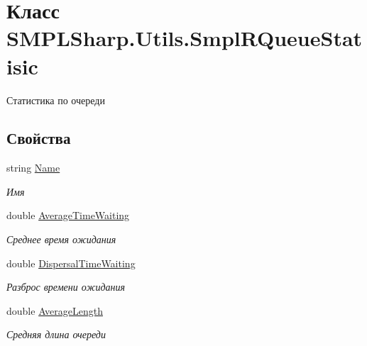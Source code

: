 \hypertarget{class_s_m_p_l_sharp_1_1_utils_1_1_smpl_r_queue_statisic}{\section{Класс S\-M\-P\-L\-Sharp.\-Utils.\-Smpl\-R\-Queue\-Statisic}
\label{de/de9/class_s_m_p_l_sharp_1_1_utils_1_1_smpl_r_queue_statisic}
}


Статистика по очереди  


\subsection*{Свойства}
\begin{DoxyCompactItemize}
\item 
string \hyperlink{class_s_m_p_l_sharp_1_1_utils_1_1_smpl_r_queue_statisic_aaa07c8c4d4ff07e2cb102dcadc700860}{Name}
\begin{DoxyCompactList}\small\item\em Имя \end{DoxyCompactList}\item 
double \hyperlink{class_s_m_p_l_sharp_1_1_utils_1_1_smpl_r_queue_statisic_a219830367adab4aac8538c90ebfba282}{Average\-Time\-Waiting}
\begin{DoxyCompactList}\small\item\em Среднее время ожидания \end{DoxyCompactList}\item 
double \hyperlink{class_s_m_p_l_sharp_1_1_utils_1_1_smpl_r_queue_statisic_ac39d2d7f7417cccfb3f7c8e8ccbb34e6}{Dispersal\-Time\-Waiting}
\begin{DoxyCompactList}\small\item\em Разброс времени ожидания \end{DoxyCompactList}\item 
double \hyperlink{class_s_m_p_l_sharp_1_1_utils_1_1_smpl_r_queue_statisic_aab2840b938ed22bd81799f7882cbc6e1}{Average\-Length}
\begin{DoxyCompactList}\small\item\em Средняя длина очереди \end{DoxyCompactList}\item 

\end{DoxyCompactItemize}
